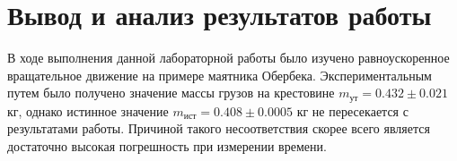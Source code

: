 \section{Вывод и анализ результатов работы}
В ходе выполнения данной лабораторной работы было изучено
равноускоренное вращательное движение на примере маятника Обербека.
Экспериментальным путем было получено значение массы грузов на крестовине 
$m_\text{ут} = 0.432 \pm 0.021  $ кг, 
однако истинное значение $m_\text{ист} = 0.408 \pm 0.0005 $ кг не пересекается с
результатами работы. Причиной такого несоответствия скорее всего является
достаточно высокая погрешность при измерении времени.

